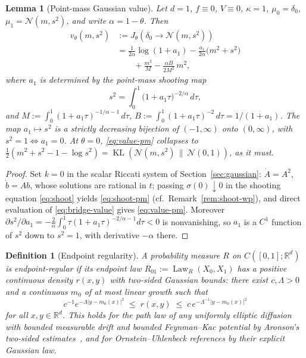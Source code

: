 \documentclass[letterpaper,10pt,conference]{IEEEtran}
\newtheorem{lemma}{Lemma}
\newtheorem{definition}{Definition}
\newcommand{\KL}{\operatorname{KL}}
\newcommand{\RR}{\mathbb{R}}
\newcommand{\cN}{\mathcal{N}}
\begin{document}
	\begin{lemma}[Point-mass Gaussian value]
		\label{lem:value-pm}
		Let $d=1$, $f\equiv0$, $V\equiv0$, $\kappa=1$, $\mu_0=\delta_0$,
		$\mu_1=\cN(m,s^2)$, and write $\alpha=1-\theta$. Then
		\begin{equation}
			\label{eq:value-pm}
			\begin{split}
				v_\theta(m,s^2)&:=J_\theta(\delta_0\to\cN(m,s^2))\\
				&=\frac{1}{2\alpha}\log(1+a_1)-\frac{a_1}{2\alpha}\bigl(m^2+s^2\bigr)\\
				&\qquad+\frac{m^2}{M}-\frac{\alpha B}{2M^2}\,m^2,
			\end{split}
		\end{equation}
		where $a_1$ is determined by the point-mass shooting map
		\begin{equation}
			\label{eq:shoot-pm}
			s^2=\int_0^1\bigl(1+a_1 \tau\bigr)^{-2/\alpha}\,d\tau,
		\end{equation}
		and $M:=\int_0^1(1+a_1\tau)^{-1/\alpha-1}\,d\tau$,
		$B:=\int_0^1(1+a_1\tau)^{-2}\,d\tau=1/(1+a_1)$. The map $a_1\mapsto s^2$ is
		a strictly decreasing bijection of $(-1,\infty)$ onto $(0,\infty)$, with
		$s^2=1\iff a_1=0$. At $\theta=0$, \eqref{eq:value-pm} collapses to
		$\frac12(m^2+s^2-1-\log s^2)=\KL(\cN(m,s^2)\,\|\,\cN(0,1))$, as it must.
	\end{lemma}
	
	\begin{proof}
		Set $k=0$ in the scalar Riccati system of Section~\ref{sec:gaussian}:
		$\dot A=A^2$, $\dot b=Ab$, whose solutions are rational in $t$; passing
		$\sigma(0)\downarrow0$ in the shooting equation \eqref{eq:shoot} yields
		\eqref{eq:shoot-pm} (cf.\ Remark~\ref{rem:shoot-wp}), and direct evaluation of
		\eqref{eq:bridge-value} gives \eqref{eq:value-pm}. Moreover
		$\partial s^2/\partial a_1=-\frac{2}{\alpha}\int_0^1\tau(1+a_1\tau)^{-2/\alpha-1}d\tau<0$
		is nonvanishing, so $a_1$ is a $C^1$ function of $s^2$ down to $s^2=1$,
		with derivative $-\alpha$ there.
	\end{proof}
	
	\begin{definition}[Endpoint regularity]
		\label{def:endpoint-regular}
		A probability measure $R$ on $C([0,1];\RR^d)$ is {endpoint-regular} if
		its endpoint law $R_{01}:=\operatorname{Law}_R(X_0,X_1)$ has a positive
		continuous density $r(x,y)$ with two-sided Gaussian bounds:
		there exist $c,\Lambda>0$ and a continuous $m_0$ of at most linear growth
		such that
		\begin{equation}
			\label{eq:endpoint-regular}
			c^{-1}e^{-\Lambda|y-m_0(x)|^2}\;\le\; r(x,y)\;\le\; c\,e^{-\Lambda^{-1}|y-m_0(x)|^2}
		\end{equation}
		for all $x,y\in\RR^d$. This holds for the path law of any uniformly elliptic diffusion with
		bounded measurable drift and bounded Feynman--Kac potential by Aronson's
		two-sided estimates~\cite{aronson1967}, and for Ornstein--Uhlenbeck
		references by their explicit Gaussian law.
	\end{definition}
	
\end{document}
